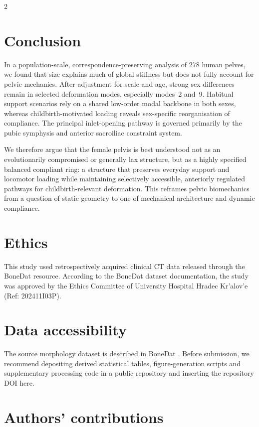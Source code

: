 \documentclass[openacc]{rsproca_new}
\begin{document}
\begin{multicols}{2}
\section{Conclusion}

In a population-scale, correspondence-preserving analysis of 278 human pelves, we found that size explains much of global stiffness but does not fully account for pelvic mechanics. After adjustment for scale and age, strong sex differences remain in selected deformation modes, especially modes~2 and~9. Habitual support scenarios rely on a shared low-order modal backbone in both sexes, whereas childbirth-motivated loading reveals sex-specific reorganisation of compliance. The principal inlet-opening pathway is governed primarily by the pubic symphysis and anterior sacroiliac constraint system.

We therefore argue that the female pelvis is best understood not as an evolutionarily compromised or generally lax structure, but as a highly specified balanced compliant ring: a structure that preserves everyday support and locomotor loading while maintaining selectively accessible, anteriorly regulated pathways for childbirth-relevant deformation. This reframes pelvic biomechanics from a question of static geometry to one of mechanical architecture and dynamic compliance.

\section*{Ethics}

This study used retrospectively acquired clinical CT data released through the BoneDat resource. According to the BoneDat dataset documentation, the study was approved by the Ethics Committee of University Hospital Hradec Kr'{a}lov'{e} (Ref: 202411I03P).

\section*{Data accessibility}

The source morphology dataset is described in BoneDat \cite{HenysKuchar2025}. Before submission, we recommend depositing derived statistical tables, figure-generation scripts and supplementary processing code in a public repository and inserting the repository DOI here.

\section*{Authors' contributions}


\end{multicols}
\end{document}
